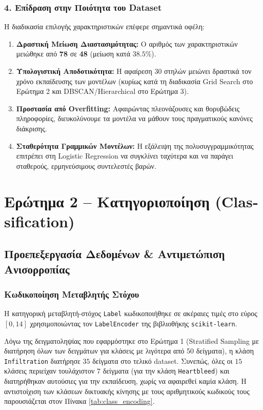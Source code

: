 \documentclass[11pt,a4paper]{article}
\newcommand{\eng}[1]{\textlatin{#1}}
\begin{document}
\subsubsection{4. Επίδραση στην Ποιότητα του \eng{Dataset}}
Η διαδικασία επιλογής χαρακτηριστικών επέφερε σημαντικά οφέλη:
\begin{enumerate}
    \item \textbf{Δραστική Μείωση Διαστασιμότητας:} Ο αριθμός των χαρακτηριστικών μειώθηκε από \textbf{78} σε \textbf{48} (μείωση κατά $38.5\%$).
    \item \textbf{Υπολογιστική Αποδοτικότητα:} Η αφαίρεση 30 στηλών μειώνει δραστικά τον χρόνο εκπαίδευσης των μοντέλων (κυρίως κατά τη διαδικασία \eng{Grid Search} στο Ερώτημα 2 και \eng{DBSCAN}/\eng{Hierarchical} στο Ερώτημα 3).
    \item \textbf{Προστασία από \eng{Overfitting}:} Αφαιρώντας πλεονάζουσες και θορυβώδεις πληροφορίες, διευκολύνουμε τα μοντέλα να μάθουν τους πραγματικούς κανόνες διάκρισης.
    \item \textbf{Σταθερότητα Γραμμικών Μοντέλων:} Η εξάλειψη της πολυσυγγραμμικότητας επιτρέπει στη \eng{Logistic Regression} να συγκλίνει ταχύτερα και να παράγει σταθερούς, ερμηνεύσιμους συντελεστές βαρών.
\end{enumerate}


\section{Ερώτημα 2 -- Κατηγοριοποίηση (\eng{Classification})}

\subsection{Προεπεξεργασία Δεδομένων \& Αντιμετώπιση Ανισορροπίας}

\subsubsection{Κωδικοποίηση Μεταβλητής Στόχου}
Η κατηγορική μεταβλητή-στόχος \texttt{\eng{Label}} κωδικοποιήθηκε σε ακέραιες τιμές στο εύρος $[0, 14]$ χρησιμοποιώντας τον \texttt{\eng{LabelEncoder}} της βιβλιοθήκης \texttt{\eng{scikit-learn}}. 

Λόγω της δειγματοληψίας που εφαρμόστηκε στο Ερώτημα 1 (\eng{Stratified Sampling} με διατήρηση όλων των δειγμάτων για κλάσεις με λιγότερα από 50 δείγματα), η κλάση \texttt{\eng{Infiltration}} διατήρησε $35$ δείγματα στο τελικό \eng{dataset}. Συνεπώς, όλες οι $15$ κλάσεις περιείχαν τουλάχιστον $7$ δείγματα (για την κλάση \texttt{\eng{Heartbleed}}) και διατηρήθηκαν αυτούσιες για την εκπαίδευση, χωρίς να αφαιρεθεί καμία κλάση. Η αντιστοίχιση των κλάσεων δικτυακής κίνησης με τους αριθμητικούς κωδικούς τους παρουσιάζεται στον Πίνακα \ref{tab:class_encoding}.
\end{document}

